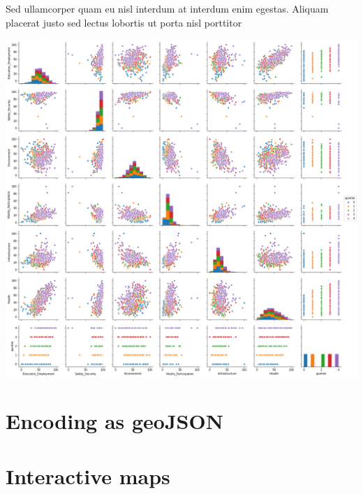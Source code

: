 Sed ullamcorper quam eu nisl interdum at interdum enim egestas. Aliquam placerat justo sed lectus lobortis ut porta nisl porttitor

\includegraphics[scale=0.3]{figures/pairplot_quintile} %



\section{Encoding as geoJSON}




\section{Interactive maps}
